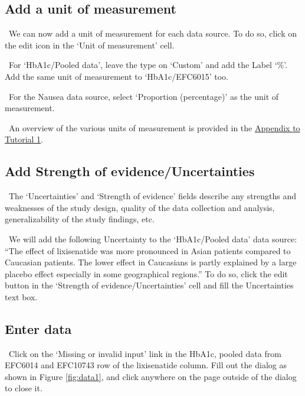 \documentclass[00_mcda_tutorial.tex]{subfiles}
\begin{document}
\subsection*{Add a unit of measurement}
\noindent \leftpointright \, We can now add a unit of measurement for each data source. To do so, click on the edit icon in the ‘Unit of measurement’ cell.
\newline

\noindent \leftpointright \, For ‘HbA1c/Pooled data’, leave the type on ‘Custom’ and add the Label ‘\%’. Add the same unit of measurement to ‘HbA1c/EFC6015’ too.
\newline

\noindent \leftpointright \, For the Nausea data source, select ‘Proportion (percentage)’ as the unit of measurement.
\newline

\noindent \faGraduationCap \, An overview of the various units of measurement is provided in the \hyperref[appendix1]{Appendix to Tutorial 1}.

\subsection*{Add Strength of evidence/Uncertainties}
\noindent \faGraduationCap \, The ‘Uncertainties’ and ‘Strength of evidence’ fields describe any strengths and weaknesses of the study design, quality of the data collection and analysis, generalizability of the study findings, etc.
\newline

\noindent \leftpointright \, We will add the following Uncertainty to the ‘HbA1c/Pooled data’ data source: “The effect of lixisenatide was more pronounced in Asian patients compared to Caucasian patients. The lower effect in Caucasians is partly explained by a large placebo effect especially in some geographical regions.” To do so, click the edit button in the ‘Strength of evidence/Uncertainties’ cell and fill the Uncertainties text box.

\subsection*{Enter data}
\noindent \leftpointright \, Click on the ‘Missing or invalid input’ link in the HbA1c, pooled data from EFC6014 and EFC10743 row of the lixisenatide column. Fill out the dialog as shown in Figure \ref{fig:data1}, and click anywhere on the page outside of the dialog to close it.
\end{document}
